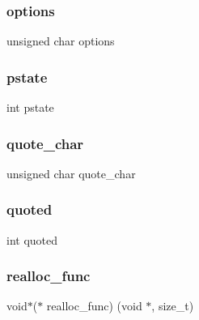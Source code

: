 \hypertarget{structcsv__parser_aa05f6399318ee41633b822ca07303438}{}\label{structcsv__parser_aa05f6399318ee41633b822ca07303438} 
\subsubsection{\texorpdfstring{options}{options}}
{\footnotesize\ttfamily unsigned char options}

\hypertarget{structcsv__parser_a57d6eb644698f5567c0511832729881d}{}\label{structcsv__parser_a57d6eb644698f5567c0511832729881d} 
\subsubsection{\texorpdfstring{pstate}{pstate}}
{\footnotesize\ttfamily int pstate}

\hypertarget{structcsv__parser_a065023bbecdc489441e184f5b06463e3}{}\label{structcsv__parser_a065023bbecdc489441e184f5b06463e3} 
\subsubsection{\texorpdfstring{quote\+\_\+char}{quote\_char}}
{\footnotesize\ttfamily unsigned char quote\+\_\+char}

\hypertarget{structcsv__parser_a17cf94344b659e2d1785109db2028acd}{}\label{structcsv__parser_a17cf94344b659e2d1785109db2028acd} 
\subsubsection{\texorpdfstring{quoted}{quoted}}
{\footnotesize\ttfamily int quoted}

\hypertarget{structcsv__parser_a58f8a7d9d7463aad1b63f837a6f86932}{}\label{structcsv__parser_a58f8a7d9d7463aad1b63f837a6f86932} 
\subsubsection{\texorpdfstring{realloc\+\_\+func}{realloc\_func}}
{\footnotesize\ttfamily void$\ast$($\ast$ realloc\+\_\+func) (void $\ast$, size\+\_\+t)}

